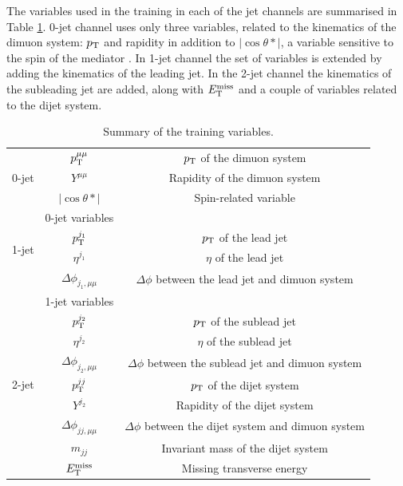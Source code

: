The variables used in the training in each of the jet channels are
summarised in Table \ref{tab:hmumu:variables}. 0-jet channel uses
only three variables, related to the kinematics of the dimuon system:
$p_{\text{T}}$ and rapidity in addition to $|\cos{\theta*}|$, a variable
sensitive to the spin of the mediator \cite{PhysRevD.16.2219,
Sirunyan:2018swq}. In 1-jet channel the set of variables is 
extended by adding the kinematics of the leading jet. In the 2-jet
channel the kinematics of the subleading jet are added, along with
$E_\text{T}^\text{miss}$ and a couple of variables related to the dijet system.
\begin{table}[h]
\centering
\caption{Summary of the training variables.}
\label{tab:hmumu:variables}
\begin{tabular}{c c c}
\toprule
\midrule
\multirow{3}{*}{0-jet} & $p_{\text{T}}^{\mu\mu}$      & $p_{\text{T}}$ of the dimuon system \\
                       & $Y^{\mu\mu}$        & Rapidity of the dimuon system\\
                       & $|\cos{\theta*}|$   & Spin-related variable \\
\midrule
\multirow{4}{*}{1-jet} & 0-jet variables            &  \\
                       & $p_{\text{T}}^{j_1}$                & $p_{\text{T}}$ of the lead jet \\
                       & $\eta^{j_1}$               & $\eta$ of the lead jet \\
                       & $\Delta \phi_{j_1,\mu\mu}$ & $\Delta \phi$ between the lead jet and dimuon system \\
\midrule
\multirow{9}{*}{2-jet} & 1-jet variables            &  \\
                       & $p_{\text{T}}^{j_2}$                & $p_{\text{T}}$ of the sublead jet \\
                       & $\eta^{j_2}$               & $\eta$ of the sublead jet \\
                       & $\Delta \phi_{j_2,\mu\mu}$ & $\Delta \phi$ between the sublead jet and dimuon system \\
                       & $p_{\text{T}}^{jj}$                 & $p_{\text{T}}$ of the dijet system \\
                       & $Y^{j_2}$                  & Rapidity of the dijet system \\
                       & $\Delta \phi_{jj,\mu\mu}$  & $\Delta \phi$ between the dijet system and dimuon system \\
                       & $m_{jj}$                   & Invariant mass of the dijet system \\
                       & $E_\text{T}^\text{miss}$                     & Missing transverse energy \\
\midrule
\bottomrule
\end{tabular}
\end{table}


